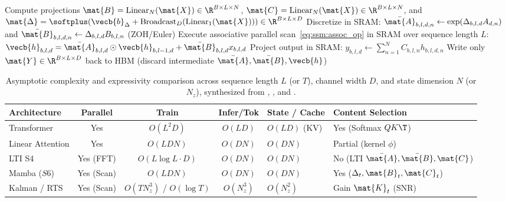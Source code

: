 \documentclass[../../../../master.tex]{subfiles}
\begin{document}
\begin{algorithm}[htbp]
\caption{Hardware-Aware Selective Scan ($S6$) with SRAM Kernel Fusion }
\label{alg:ssm:mamba_s6}
Compute projections $\mat{B} = \mathrm{Linear}_N(\mat{X}) \in \R^{B \times L \times N}$, $\mat{C} = \mathrm{Linear}_N(\mat{X}) \in \R^{B \times L \times N}$, and $\mat{\Delta} = \softplus(\vecb{b}_\Delta + \mathrm{Broadcast}_D(\mathrm{Linear}_1(\mat{X}))) \in \R^{B \times L \times D}$\;
Discretize in SRAM: $\bar{\mat{A}}_{b,l,d,n} \gets \exp(\Delta_{b,l,d} A_{d,n})$ and $\bar{\mat{B}}_{b,l,d,n} \gets \Delta_{b,l,d} B_{b,l,n}$ (ZOH/Euler)\;
Execute associative parallel scan~\eqref{eq:ssm:assoc_op} in SRAM over sequence length $L$: $\vecb{h}_{b,l,d} = \bar{\mat{A}}_{b,l,d} \odot \vecb{h}_{b,l-1,d} + \bar{\mat{B}}_{b,l,d} x_{b,l,d}$\;
Project output in SRAM: $y_{b,l,d} \gets \sum_{n=1}^N C_{b,l,n} h_{b,l,d,n}$\;
Write only $\mat{Y} \in \R^{B \times L \times D}$ back to HBM (discard intermediate $\bar{\mat{A}}, \bar{\mat{B}}, \vecb{h}$)\;
\;
\end{algorithm}

\begin{table}[htbp]
\centering
\footnotesize
\setlength{\tabcolsep}{4pt}
\begin{tabularx}{\textwidth}{@{}l c c c >{\raggedright\arraybackslash}X >{\raggedright\arraybackslash}X@{}}
\toprule
\textbf{Architecture} & \textbf{Parallel} & \textbf{Train} & \textbf{Infer/Tok} & \textbf{State / Cache} & \textbf{Content Selection} \\
\midrule
Transformer & Yes & $O(L^2 D)$ & $O(L D)$ & $O(L D)$ (KV) & Yes (Softmax $QK\T$) \\
Linear Attention & Yes & $O(L D N)$ & $O(D N)$ & $O(D N)$ & Partial (kernel $\phi$) \\
LTI S4 & Yes (FFT) & $O(L \log L \cdot D)$ & $O(D N)$ & $O(D N)$ & No (LTI $\bar{\mat{A}},\bar{\mat{B}},\mat{C}$) \\
Mamba ($S6$) & Yes (Scan) & $O(L D N)$ & $O(D N)$ & $O(D N)$ & Yes ($\Delta_t, \mat{B}_t, \mat{C}_t$) \\
Kalman / RTS & Yes (Scan) & $O(T N_z^3)$ / $O(\log T)$ & $O(N_z^3)$ & $O(N_z^2)$ & Gain $\mat{K}_t$ (SNR) \\
\bottomrule
\end{tabularx}
\caption{Asymptotic complexity and expressivity comparison across sequence length $L$ (or $T$), channel width $D$, and state dimension $N$ (or $N_z$), synthesized from , , and .}\label{tab:ssm:complexity}
\end{table}
\end{document}
